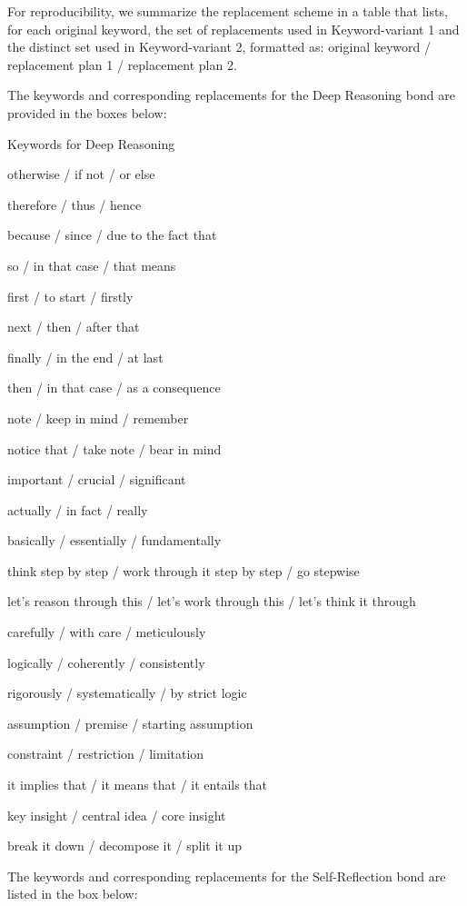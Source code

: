 For reproducibility, we summarize the replacement scheme in a table that lists, for each original keyword, the set of replacements used in Keyword-variant 1 and the distinct set used in Keyword-variant 2, formatted as: original keyword / replacement plan 1 / replacement plan 2.

The keywords and corresponding replacements for the Deep Reasoning bond are provided in the boxes below:
\begin{PromptBox}{Keywords for Deep Reasoning}


otherwise / if not / or else

therefore / thus / hence

because / since / due to the fact that

so / in that case / that means

first / to start / firstly

next / then / after that

finally / in the end / at last

then / in that case / as a consequence

note / keep in mind / remember

notice that / take note / bear in mind 

important / crucial / significant

actually / in fact / really

basically / essentially / fundamentally 

think step by step / work through it step by step / go stepwise

let's reason through this / let's work through this / let's think it through

carefully / with care / meticulously

logically / coherently / consistently

rigorously / systematically / by strict logic

assumption / premise / starting assumption

constraint / restriction / limitation

it implies that / it means that / it entails that

key insight / central idea / core insight

break it down / decompose it / split it up



\end{PromptBox}


The keywords and corresponding replacements for the Self-Reflection bond are listed in the box below:

